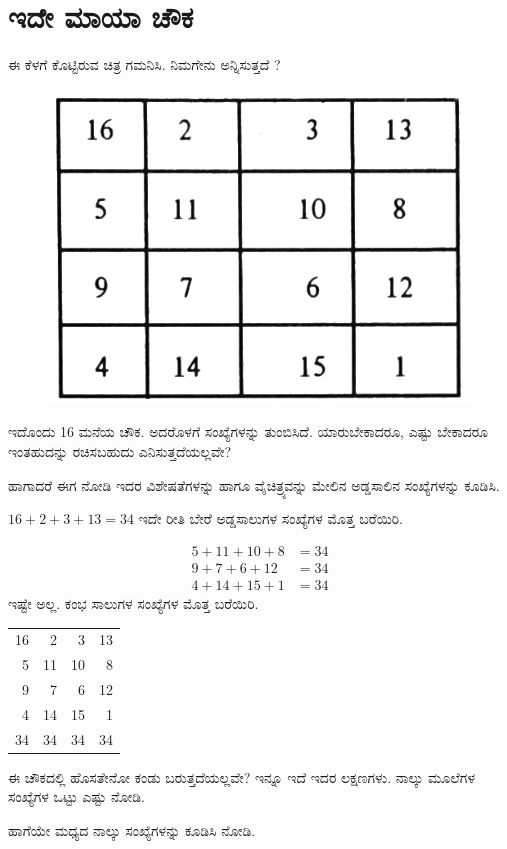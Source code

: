 \chapter{ಇದೇ ಮಾಯಾ ಚೌಕ}

ಈ ಕೆಳಗೆ ಕೊಟ್ಟಿರುವ ಚಿತ್ರ ಗಮನಿಸಿ. ನಿಮಗೇನು ಅನ್ನಿಸುತ್ತದೆ ?
\begin{figure}[H]
  \includegraphics{src/figures/chap1/fig1.1.jpg}
\end{figure}
ಇದೊಂದು 16 ಮನೆಯ ಚೌಕ. ಅದರೊಳಗೆ ಸಂಖ್ಯೆಗಳನ್ನು ತುಂಬಿಸಿದೆ. ಯಾರುಬೇಕಾದರೂ, ಎಷ್ಟು ಬೇಕಾದರೂ ಇಂತಹುದನ್ನು ರಚಿಸಬಹುದು ಎನಿಸುತ್ತದೆಯಲ್ಲವೇ?

ಹಾಗಾದರೆ ಈಗ ನೋಡಿ ಇದರ ವಿಶೇಷತೆಗಳನ್ನು ಹಾಗೂ ವೈಚಿತ್ರ್ಯವನ್ನು ಮೇಲಿನ ಅಡ್ಡಸಾಲಿನ ಸಂಖ್ಯೆಗಳನ್ನು ಕೂಡಿಸಿ.

$16+2+3+13=34$
ಇದೇ ರೀತಿ ಬೇರೆ ಅಡ್ಡಸಾಲುಗಳ ಸಂಖ್ಯೆಗಳ ಮೊತ್ತ ಬರೆಯಿರಿ.

\begin{align*}
5+11+10+8 & = 34\\
9+7+6+12 & = 34\\
4+14+15+1 & = 34
\end{align*}
ಇಷ್ಟೇ ಅಲ್ಲ. ಕಂಭ ಸಾಲುಗಳ ಸಂಖ್ಯೆಗಳ ಮೊತ್ತ ಬರೆಯಿರಿ.
\begin{tabular}{rrrr}
16 & 2 & 3 & 13 \\
5 & 11 & 10 & 8\\
9 & 7 & 6 & 12\\
4 & 14 & 15 & 1\\
34 & 34 & 34 & 34 
\end{tabular}
ಈ ಚೌಕದಲ್ಲಿ ಹೊಸತೇನೋ ಕಂಡು ಬರುತ್ತದೆಯಲ್ಲವೇ? ಇನ್ನೂ ಇದೆ ಇದರ ಲಕ್ಷಣಗಳು. ನಾಲ್ಕು ಮೂಲೆಗಳ ಸಂಖ್ಯೆಗಳ ಒಟ್ಟು ಎಷ್ಟು ನೋಡಿ.

ಹಾಗೆಯೇ ಮಧ್ಯದ ನಾಲ್ಕು ಸಂಖ್ಯೆಗಳನ್ನು ಕೂಡಿಸಿ ನೋಡಿ.

